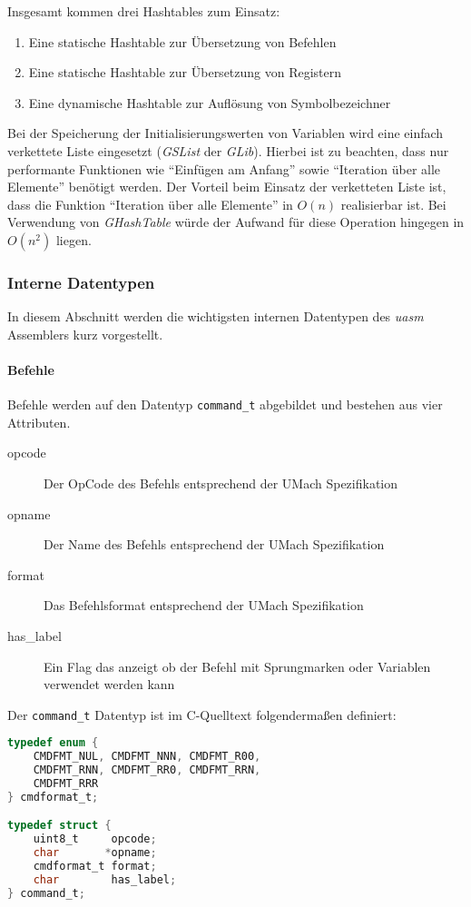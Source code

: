 Insgesamt kommen drei Hashtables zum Einsatz:
\begin{enumerate}
    \item Eine statische Hashtable zur Übersetzung von Befehlen
    \item Eine statische Hashtable zur Übersetzung von Registern
    \item Eine dynamische Hashtable zur Auflösung von Symbolbezeichner
\end{enumerate}

Bei der Speicherung der Initialisierungswerten von Variablen wird eine
einfach verkettete Liste eingesetzt (\emph{GSList} der \emph{GLib}).
Hierbei ist zu beachten, dass nur performante Funktionen wie
``Einfügen am Anfang'' sowie ``Iteration über alle Elemente'' benötigt werden.
Der Vorteil beim Einsatz der verketteten Liste ist, dass die
Funktion ``Iteration über alle Elemente'' in $O(n)$ realisierbar ist. Bei
Verwendung von \emph{GHashTable} würde der Aufwand für diese Operation hingegen
in $O(n^2)$ liegen.

\subsubsection{Interne Datentypen}

In diesem Abschnitt werden die wichtigsten internen Datentypen des \emph{uasm}
Assemblers kurz vorgestellt.

\paragraph{Befehle} Befehle werden auf den Datentyp \texttt{command\_t}
abgebildet und bestehen aus vier Attributen.

\begin{description}
    \item[opcode] Der OpCode des Befehls entsprechend der UMach Spezifikation
    \item[opname] Der Name des Befehls entsprechend der UMach Spezifikation
    \item[format] Das Befehlsformat entsprechend der UMach Spezifikation
    \item[has\_label] Ein Flag das anzeigt ob der Befehl mit Sprungmarken oder
                      Variablen verwendet werden kann
\end{description}

Der \texttt{command\_t} Datentyp ist im C-Quelltext folgendermaßen definiert:

\begin{lstlisting}[language=C]
typedef enum {
    CMDFMT_NUL, CMDFMT_NNN, CMDFMT_R00,
    CMDFMT_RNN, CMDFMT_RR0, CMDFMT_RRN,
    CMDFMT_RRR
} cmdformat_t;

typedef struct {
    uint8_t     opcode;
    char       *opname;
    cmdformat_t format;
    char        has_label;
} command_t;
\end{lstlisting}

